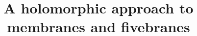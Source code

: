\documentclass[11pt]{amsart}
\begin{document}
\title{A holomorphic approach to membranes and fivebranes}









 
 


\end{document}
